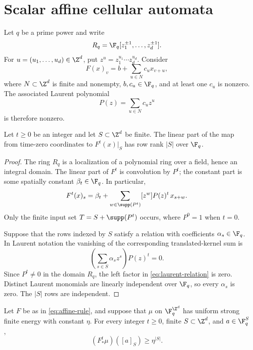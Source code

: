 \section{Scalar affine cellular automata}
\label{sec:affine}

Let $q$ be a prime power and write
\[
  R_q=\F_q[z_1^{\pm1},\ldots,z_d^{\pm1}].
\]
For $u=(u_1,\ldots,u_d)\in\Z^d$, put
$z^u=z_1^{u_1}\cdots z_d^{u_d}$.  Consider
\begin{equation}\label{eq:affine-rule}
  F(x)_v=b+\sum_{u\in N}c_u x_{v+u},
\end{equation}
where $N\subset\Z^d$ is finite and nonempty, $b,c_u\in\F_q$, and at least one
$c_u$ is nonzero.  The associated Laurent polynomial
\[
  P(z)=\sum_{u\in N}c_u z^u
\]
is therefore nonzero.

\begin{lemma}\label{lem:affine-rank}
Let $t\geq0$ be an integer and let $S\subset\Z^d$ be finite.  The linear part of the map
from time-zero coordinates to $F^t(x)|_S$ has row rank $|S|$ over $\F_q$.
\end{lemma}

\begin{proof}
The ring $R_q$ is a localization of a polynomial ring over a field, hence an
integral domain.  The linear part of $F^t$ is convolution by $P^t$; the
constant part is some spatially constant $\beta_t\in\F_q$.  In particular,
\begin{equation}\label{eq:iterate-affine}
  F^t(x)_s=\beta_t+
    \sum_{w\in\supp(P^t)}[z^w]P(z)^t\,x_{s+w}.
\end{equation}
Only the finite input set
$T=S+\supp(P^t)$ occurs, where $P^0=1$ when $t=0$.

Suppose that the rows indexed by $S$ satisfy a relation with coefficients
$\alpha_s\in\F_q$.  In Laurent notation the vanishing of the corresponding
translated-kernel sum is
\begin{equation}\label{eq:laurent-relation}
   \left(\sum_{s\in S}\alpha_s z^s\right)P(z)^t=0.
\end{equation}
Since $P^t\neq0$ in the domain $R_q$, the left factor in
\eqref{eq:laurent-relation} is zero.  Distinct Laurent monomials are linearly
independent over $\F_q$, so every $\alpha_s$ is zero.  The $|S|$ rows are
independent.
\end{proof}

\begin{theorem}\label{thm:affine}
Let $F$ be as in \eqref{eq:affine-rule}, and suppose that $\mu$ on
$\F_q^{\Z^d}$ has uniform strong finite energy with constant $\eta$.  For
every integer $t\geq0$, finite $S\subset\Z^d$, and $a\in\F_q^S$,
\[
   (F^t_*\mu)([a]_S)\geq\eta^{|S|}.
\]
\end{theorem}

